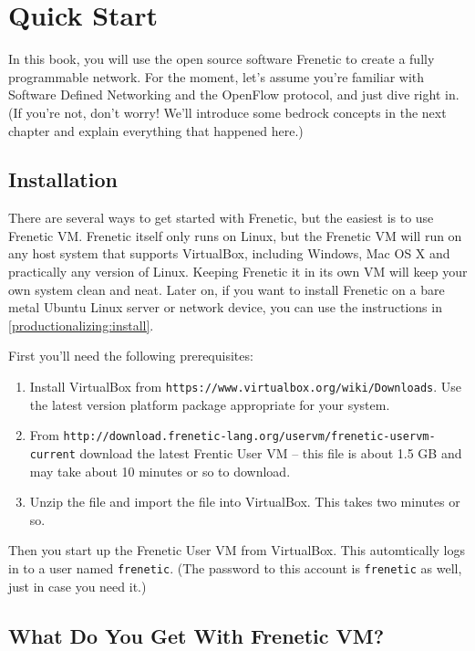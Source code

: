 
\chapter{Quick Start}

In this book, you will use the open source software Frenetic to create a fully programmable network.  
For the moment, let's assume you're familiar with Software Defined Networking and the OpenFlow protocol, 
and just dive right in.  (If you're not, don't worry!  
We'll introduce some bedrock concepts in the next chapter and explain everything that happened here.)  

\section{Installation}

There are several ways to get started with Frenetic, but the easiest is to use Frenetic VM.  
Frenetic itself only runs on Linux, but the Frenetic VM will run on any host system that supports 
VirtualBox, including Windows, Mac OS X and practically any version of Linux.   
Keeping Frenetic it in its own VM will keep your own system clean and neat.  
Later on, if you want to install Frenetic on a bare metal Ubuntu Linux server or network device, 
you can use the instructions in \ref{productionalizing:install}. 

First you'll need the following prerequisites: 

\begin{enumerate}
\item Install VirtualBox from \texttt{https://www.virtualbox.org/wiki/Downloads}.  Use the latest version platform package appropriate for your system.  
\item From 
\texttt{http://download.frenetic-lang.org/uservm/frenetic-uservm-current}
download the latest Frentic User VM -- this file is about 1.5 GB and
may take about 10 minutes or so to download.  
\item Unzip the file and import the  file into VirtualBox.  This takes two minutes or
so.  
\end{enumerate}

Then you start up the Frenetic User VM from VirtualBox.  This automtically logs in to a user named 
\texttt{frenetic}.  (The password to this account is \texttt{frenetic} as well, just in case you 
need it.)

\section{What Do You Get With Frenetic VM?}

